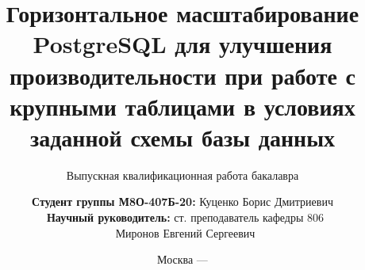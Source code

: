 \title{Горизонтальное масштабирование PostgreSQL для улучшения производительности при работе с крупными таблицами в условиях заданной схемы базы данных}

\subtitle{Выпускная квалификационная работа бакалавра}


\author[Куценко Борис Дмитриевич]
{
  \textbf{Студент группы М8О-407Б-20:} Куценко Борис Дмитриевич\\
  \ \textbf{Научный руководитель:} ст. преподаватель кафедры 806\\\ Миронов Евгений Сергеевич
}


\date{Москва --- \the\year}

